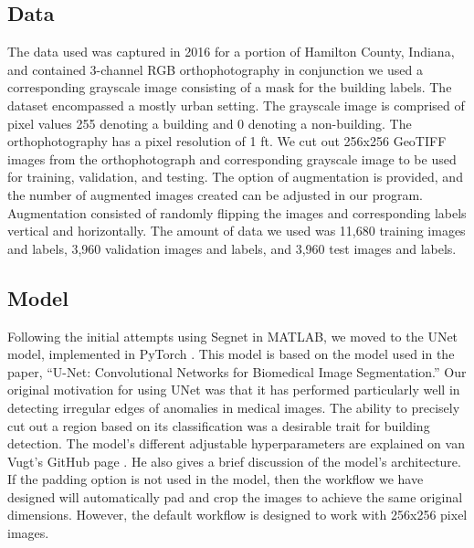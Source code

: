 \documentclass[acmtog, authorversion]{acmart}
\begin{document}
\subsection{Data}
 The data used was captured in 2016 for a portion of Hamilton County, Indiana, and contained 3-channel RGB orthophotography \cite{ISDP} in conjunction we used a corresponding grayscale image consisting of a mask for the building labels. The dataset encompassed a mostly urban setting. The grayscale image is comprised of pixel values 255 denoting a building and 0 denoting a non-building. The orthophotography has a pixel resolution of 1 ft. We cut out 256x256 GeoTIFF images from the orthophotograph and corresponding grayscale image to be used for training, validation, and testing. The option of augmentation is provided, and the number of augmented images created can be adjusted in our program. Augmentation consisted of randomly flipping the images and corresponding labels vertical and horizontally. The amount of data we used was 11,680 training images and labels, 3,960 validation images and labels, and 3,960 test images and labels.

\subsection{Model}
Following the initial attempts using Segnet in MATLAB, we moved to the UNet model, implemented in PyTorch \cite{Joris2019}. This model is based on the model used in the paper, “U-Net: Convolutional Networks for Biomedical Image Segmentation.”\cite{ronneberger2015unet} Our original motivation for using UNet was that it has performed particularly well in detecting irregular edges of anomalies in medical images. The ability to precisely cut out a region based on its classification was a desirable trait for building detection. The model’s different adjustable hyperparameters are explained on van Vugt’s GitHub page \cite{Joris2019}. He also gives a brief discussion of the model’s architecture. If the padding option is not used in the model, then the workflow we have designed will automatically pad and crop the images to achieve the same original dimensions. However, the default workflow is designed to work with 256x256 pixel images.
\end{document}
